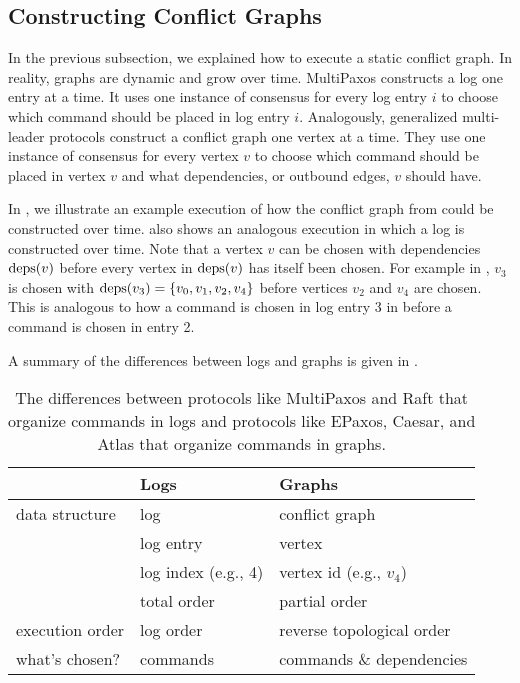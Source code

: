 \subsection{Constructing Conflict Graphs}
In the previous subsection, we explained how to execute a static conflict
graph. In reality, graphs are dynamic and grow over time. MultiPaxos constructs
a log one entry at a time. It uses one instance of consensus for every log
entry $i$ to choose which command should be placed in log entry $i$.
Analogously, generalized multi-leader protocols construct a conflict graph one
vertex at a time. They use one instance of consensus for every vertex $v$ to
choose which command should be placed in vertex $v$ and what dependencies, or
outbound edges, $v$ should have.

In , we illustrate an example execution of how
the conflict graph from  could be constructed over time.
 also shows an analogous execution in which a log
is constructed over time. Note that a vertex $v$ can be chosen with
dependencies $\text{deps}(v)$ before every vertex in $\text{deps}(v)$ has itself been
chosen. For example in , $v_3$ is chosen with $\text{deps}(v_3) =
\{v_0, v_1, v_2, v_4\}$ before vertices $v_2$ and $v_4$ are chosen. This is
analogous to how a command is chosen in log entry 3 in  before a
command is chosen in entry 2.

A summary of the differences between logs and graphs is given in
.

{}

\begin{table}
  \caption{%
    The differences between protocols like MultiPaxos and Raft that organize
    commands in logs and protocols like EPaxos, Caesar, and Atlas that organize
    commands in graphs.
  }
  \begin{tabular}{lll}
    \toprule
                    & Logs                & Graphs \\\midrule
    data structure  & log                 & conflict graph \\
                    & log entry           & vertex \\
                    & log index (e.g., 4) & vertex id (e.g., $v_4$) \\
                    & total order         & partial order \\
    execution order & log order           & reverse topological order \\
    what's chosen?  & commands            & commands \& dependencies \\
    \bottomrule
  \end{tabular}
\end{table}

